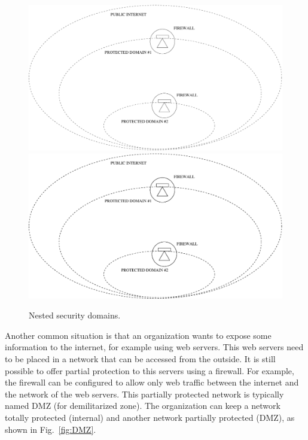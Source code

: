 \begin{figure}
\centering
\ifpdf
\includegraphics[width=0.5\linewidth]{Figures/Nested_security_domains.pdf}
\else
\includegraphics[width=0.5\linewidth]{Figures/Nested_security_domains.eps}
\fi
\caption{Nested security domains.}
\label{fig:Nested_security_domains}
\end{figure}

Another common situation is that an organization wants to expose some information to the internet, for example using web servers.
This web servers need to be placed in a network that can be accessed from the outside.
It is still possible to offer partial protection to this servers using a firewall.
For example, the firewall can be configured to allow only web traffic between the internet and the network of the web servers.
This partially protected network is typically named DMZ (for demilitarized zone).
The organization can keep a network totally protected (internal) and another network partially protected (DMZ), as shown in Fig.~\ref{fig:DMZ}.

